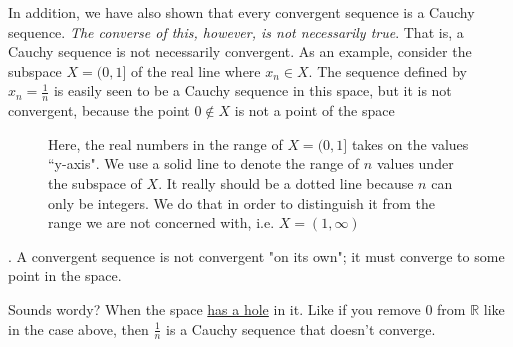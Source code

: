 In addition, we have also shown that every convergent sequence is a Cauchy sequence. \textit{The converse of this,
however, is not necessarily true}. That is, a Cauchy sequence is not necessarily convergent. As an example, consider the
subspace $X = (0, 1]$ of the real line where $x_n \in X$. The sequence defined by $x_n = \frac{1}{n}$ is easily seen to
be a Cauchy sequence in this space, but it is not convergent, because the point $0 \not\in X$ is not a point of the
space

\begin{figure}[H]
    \centering
    \caption{Here, the real numbers in the range of $X = (0, 1]$ takes on the values ``y-axis". We use a solid line to
    denote the range of $n$ values under the subspace of $X$. It really should be a dotted line because $n$ can only be
    integers. We do that in order to distinguish it from the range we are not concerned with, i.e. $X = (1, \infty)$}
\end{figure}

. A convergent sequence is not convergent "on its own"; it must converge to
some point in the space.

Sounds wordy? When the space \href{https://www.reddit.com/r/learnmath/comments/exp735/comment/fgaqd8p/?utm\_source=share&utm\_medium=web3x&utm\_name=web3xcss&utm\_term=1&utm\_content=share\_button}{has a hole} in it. Like if you remove 0 from $\mathbb{R}$ like in the case above, then
$\frac{1}{n}$ is a Cauchy sequence that doesn't converge.

